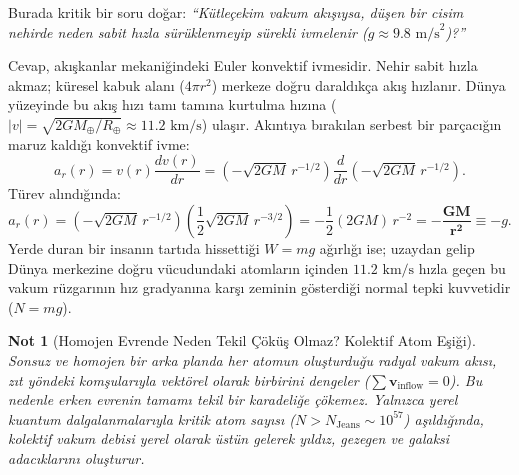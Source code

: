 \documentclass[11pt,a4paper]{article}
\newtheorem{remark}{Not}[section]
\begin{document}
Burada kritik bir soru doğar: \textit{``Kütleçekim vakum akışıysa, düşen bir cisim nehirde neden sabit hızla sürüklenmeyip sürekli ivmelenir ($g \approx 9.8\text{ m/s}^2$)?''}

Cevap, akışkanlar mekaniğindeki Euler konvektif ivmesidir. Nehir sabit hızla akmaz; küresel kabuk alanı ($4\pi r^2$) merkeze doğru daraldıkça akış hızlanır. Dünya yüzeyinde bu akış hızı tamı tamına kurtulma hızına ($|v| = \sqrt{2GM_\oplus/R_\oplus} \approx 11.2\text{ km/s}$) ulaşır. Akıntıya bırakılan serbest bir parçacığın maruz kaldığı konvektif ivme:
\begin{equation}
    a_r(r) = v(r) \frac{dv(r)}{dr} = \left(-\sqrt{2GM} \, r^{-1/2}\right) \frac{d}{dr}\left(-\sqrt{2GM} \, r^{-1/2}\right).
\end{equation}
Türev alındığında:
\begin{equation}
    a_r(r) = \left(-\sqrt{2GM} \, r^{-1/2}\right) \left(\frac{1}{2}\sqrt{2GM} \, r^{-3/2}\right) = -\frac{1}{2}(2GM) \, r^{-2} = \mathbf{-\frac{GM}{r^2}} \equiv -g.
    \label{eq:g_ispat_p1}
\end{equation}
Yerde duran bir insanın tartıda hissettiği $W = mg$ ağırlığı ise; uzaydan gelip Dünya merkezine doğru vücudundaki atomların içinden $11.2\text{ km/s}$ hızla geçen bu vakum rüzgarının hız gradyanına karşı zeminin gösterdiği normal tepki kuvvetidir ($N = mg$).

\begin{remark}[Homojen Evrende Neden Tekil Çöküş Olmaz? Kolektif Atom Eşiği]
    Sonsuz ve homojen bir arka planda her atomun oluşturduğu radyal vakum akısı, zıt yöndeki komşularıyla vektörel olarak birbirini dengeler ($\sum \mathbf{v}_{\mathrm{inflow}} = 0$). Bu nedenle erken evrenin tamamı tekil bir karadeliğe çökemez. Yalnızca yerel kuantum dalgalanmalarıyla kritik atom sayısı ($N > N_{\mathrm{Jeans}} \sim 10^{57}$) aşıldığında, kolektif vakum debisi yerel olarak üstün gelerek yıldız, gezegen ve galaksi adacıklarını oluşturur.
\end{remark}
\end{document}
